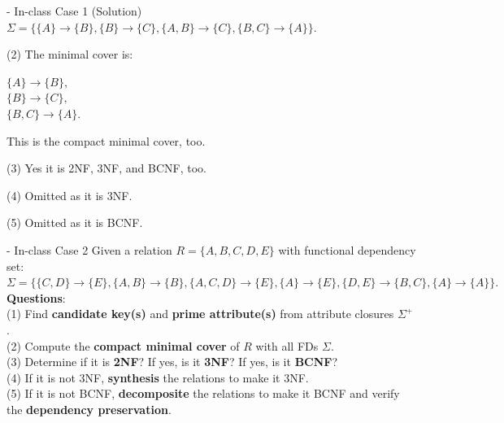 \begin{frame}[fragile]{ - In-class Case 1 (Solution)}
	$\Sigma=\{\{A\} \rightarrow \{B\},\{B\} \rightarrow \{C\}, \{A, B\} \rightarrow \{C\},\{B, C\} \rightarrow \{A\}\}.$\\\vspace{25pt}
	
	(2) The minimal cover is:\\\vspace{5pt}
	
	$\{A\} \rightarrow \{B\},$\\
	$\{B\}  \rightarrow \{C\},$\\
	$\{B,C\} \rightarrow \{A\}.$\\\vspace{5pt}
	
	This is the compact minimal cover, too.\\\vspace{5pt}
	
	(3)  Yes it is 2NF, 3NF, and BCNF, too.\\\vspace{5pt}
	
	(4) Omitted as it is 3NF. \\\vspace{5pt}
	
	(5) Omitted as it is BCNF. \\\vspace{5pt}
	
\end{frame}

\begin{frame}[fragile]{ - In-class Case 2}
	Given a relation $R=\{A, B, C, D, E\}$ with functional dependency set:\\ 
	$\Sigma=\{\{C,D\} \rightarrow \{E\},\{A,B\} \rightarrow \{B\}, \{A,C,D\} \rightarrow \{E\},\{A\} \rightarrow \{E\},\{D,E\} \rightarrow \{B,C\},\{A\} \rightarrow \{A\}\}.$\\\vspace{10pt}
	\textbf{Questions}:\\
	(1) Find \textbf{candidate key(s)} and \textbf{prime attribute(s)} from attribute closures $\Sigma^{+}$.\\
	(2) Compute the \textbf{compact minimal cover} of $R$ with all FDs $\Sigma$.\\
	(3) Determine if it is \textbf{2NF}? If yes, is it \textbf{3NF}? If yes, is it \textbf{BCNF}?\\
	(4) If it is not 3NF, \textbf{synthesis} the relations to make it 3NF.\\
	(5) If it is not BCNF, \textbf{decomposite} the relations to make it BCNF and verify the \textbf{dependency preservation}. 
\end{frame}

